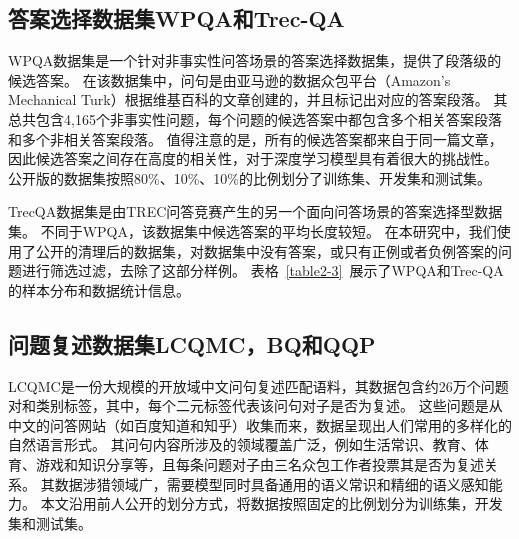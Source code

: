 \subsection{答案选择数据集WPQA和Trec-QA}


WPQA数据集是一个针对非事实性问答场景的答案选择数据集，提供了段落级的候选答案。
在该数据集中，问句是由亚马逊的数据众包平台（Amazon’s Mechanical Turk）根据维基百科的文章创建的，并且标记出对应的答案段落。
其总共包含4,165个非事实性问题，每个问题的候选答案中都包含多个相关答案段落和多个非相关答案段落。
值得注意的是，所有的候选答案都来自于同一篇文章，因此候选答案之间存在高度的相关性，对于深度学习模型具有着很大的挑战性。
公开版的数据集按照80\%、10\%、10\%的比例划分了训练集、开发集和测试集。

TrecQA数据集是由TREC问答竞赛产生的另一个面向问答场景的答案选择型数据集。
不同于WPQA，该数据集中候选答案的平均长度较短。
在本研究中，我们使用了公开的清理后的数据集，对数据集中没有答案，或只有正例或者负例答案的问题进行筛选过滤，去除了这部分样例。
表格~\ref{table2-3}~展示了WPQA和Trec-QA的样本分布和数据统计信息。




\subsection{问题复述数据集LCQMC，BQ和QQP}

LCQMC是一份大规模的开放域中文问句复述匹配语料，其数据包含约26万个问题对和类别标签，其中，每个二元标签代表该问句对子是否为复述。
这些问题是从中文的问答网站（如百度知道和知乎）收集而来，数据呈现出人们常用的多样化的自然语言形式。
其问句内容所涉及的领域覆盖广泛，例如生活常识、教育、体育、游戏和知识分享等，且每条问题对子由三名众包工作者投票其是否为复述关系。
其数据涉猎领域广，需要模型同时具备通用的语义常识和精细的语义感知能力。
本文沿用前人公开的划分方式，将数据按照固定的比例划分为训练集，开发集和测试集。

